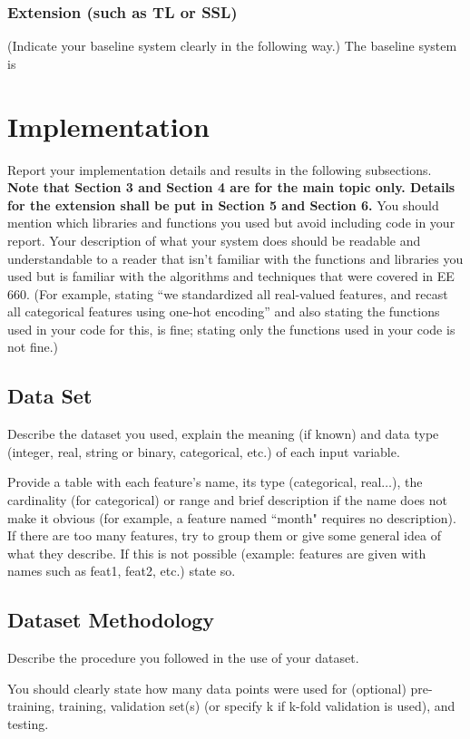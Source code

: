 \documentclass[singlecolumn]{article}
\begin{document}
\subsubsection{Extension (such as TL or SSL)}\label{subsec-ext}
(Indicate your baseline system clearly in the following way.)  The baseline system is 

\section{Implementation}\label{sec-implementation}
Report your implementation details and results in the following subsections. \textbf{Note that Section 3 and Section 4 are for the main topic only. Details for the extension shall be put in Section 5 and Section 6.} You should mention which libraries and functions you used but avoid including code in your report.  Your description of what your system does should be readable and understandable to a reader that isn’t familiar with the functions and libraries you used but is familiar with the algorithms and techniques that were covered in EE 660.  (For example, stating “we standardized all real-valued features, and recast all categorical features using one-hot encoding” and also stating the functions used in your code for this, is fine; stating only the functions used in your code is not fine.) 

\subsection{Data Set}
Describe the dataset you used, explain the meaning (if known) and data type (integer, real, string or binary, categorical, etc.) of each input variable.
  
Provide a table with each feature's name, its type (categorical, real$\dots$), the cardinality (for categorical) or range and brief description if the name does not make it obvious (for example, a feature named ``month" requires no description). If there are too many features, try to group them or give some general idea of what they describe. If this is not possible (example: features are given with names such as feat1, feat2, etc.) state so.

\subsection{Dataset Methodology}
Describe the procedure you followed in the use of your dataset.

You should clearly state how many data points were used for (optional) pre-training, training, validation set(s) (or specify k if k-fold validation is used), and testing. 
\end{document}
